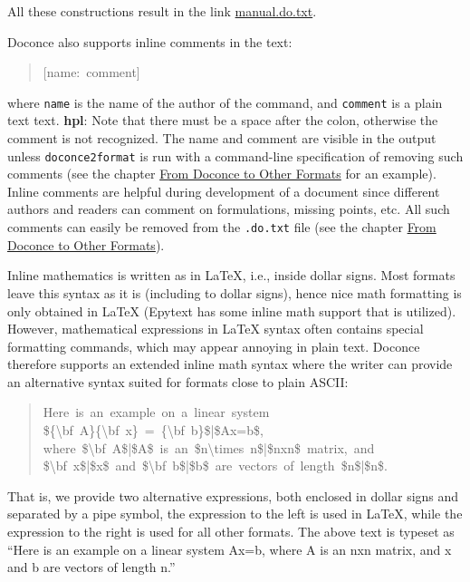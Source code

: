 \documentclass[a4paper,english]{article}
\begin{document}
All these constructions result in the link \url{manual.do.txt}.

Doconce also supports inline comments in the text:
%
\begin{quote}{\ttfamily \raggedright \noindent
{[}name:~comment{]}
}
\end{quote}

where \texttt{name} is the name of the author of the command, and \texttt{comment} is a
plain text text. \textbf{hpl}: Note that there must be a space after the colon,
otherwise the comment is not recognized.
The name and comment are visible in the output unless \texttt{doconce2format}
is run with a command-line specification of removing such comments
(see the chapter \hyperref[from-doconce-to-other-formats]{From Doconce to Other Formats} for an example). Inline comments
are helpful during development of a document since different authors
and readers can comment on formulations, missing points, etc.
All such comments can easily be removed from the \texttt{.do.txt} file
(see the chapter \hyperref[from-doconce-to-other-formats]{From Doconce to Other Formats}).

Inline mathematics is written as in LaTeX, i.e., inside dollar signs.
Most formats leave this syntax as it is (including to dollar signs),
hence nice math formatting is only obtained in LaTeX (Epytext has some
inline math support that is utilized).  However, mathematical
expressions in LaTeX syntax often contains special formatting
commands, which may appear annoying in plain text. Doconce therefore
supports an extended inline math syntax where the writer can provide
an alternative syntax suited for formats close to plain ASCII:
%
\begin{quote}{\ttfamily \raggedright \noindent
Here~is~an~example~on~a~linear~system\\
\$\{\textbackslash{}bf~A\}\{\textbackslash{}bf~x\}~=~\{\textbackslash{}bf~b\}\$|\$Ax=b\$,\\
where~\$\textbackslash{}bf~A\$|\$A\$~is~an~\$n\textbackslash{}times~n\$|\$nxn\$~matrix,~and\\
\$\textbackslash{}bf~x\$|\$x\$~and~\$\textbackslash{}bf~b\$|\$b\$~are~vectors~of~length~\$n\$|\$n\$.
}
\end{quote}

That is, we provide two alternative expressions, both enclosed in
dollar signs and separated by a pipe symbol, the expression to the
left is used in LaTeX, while the expression to the right is used for
all other formats.  The above text is typeset as ``Here is an example
on a linear system Ax=b, where A
is an nxn matrix, and x and b
are vectors of length n.''
\end{document}
